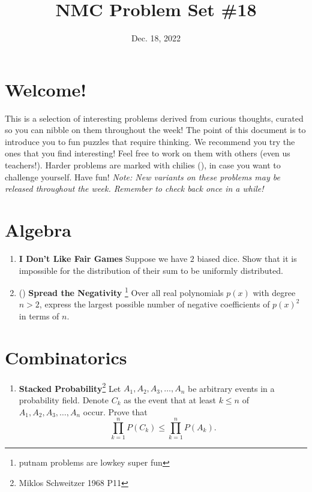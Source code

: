 \documentclass[11pt]{scrartcl}
\begin{document}
\title{NMC Problem Set \#18} %
\date{Dec. 18, 2022} %
\maketitle

\section*{Welcome!}

This is a selection of interesting problems derived from curious thoughts, curated so you can nibble on them throughout the week! The point of this document is to introduce you to fun puzzles that require thinking. We recommend you try the ones that you find interesting! Feel free to work on them with others (even us teachers!). Harder problems are marked with chilies (\fullchili), in case you want to challenge yourself.
\newline\newline
Have fun! \textit{Note: New variants on these problems may be released throughout the week. Remember to check back once in a while!}
    
\section{Algebra}
\begin{enumerate}[label=\textbf{A\arabic*}.]
    \item \textbf{I Don't Like Fair Games} \newline
    Suppose we have $2$ biased dice. Show that it is impossible for the distribution of their sum to be uniformly distributed.

    \item (\halfchili) \textbf{Spread the Negativity} \footnote{putnam problems are lowkey super fun} \newline
    Over all real polynomials $p(x)$ with degree $n > 2$, express the largest possible number of negative coefficients of $p(x)^2$ in terms of $n$.
\end{enumerate}

\newpage
\section{Combinatorics}
\begin{enumerate}[label=\textbf{C\arabic*}.]
    \item \textbf{Stacked Probability}\footnote{Miklos Schweitzer 1968 P11} \newline
    Let $A_1, A_2, A_3, \dots, A_n$ be arbitrary events in a probability field. Denote $C_k$ as the event that at least $k \leq n$ of $A_1, A_2, A_3, \dots, A_n$ occur. Prove that
    \[ \prod_{k=1}^n P(C_k) \leq  \prod_{k=1}^n P(A_k). \]
\end{enumerate}
\end{document}
